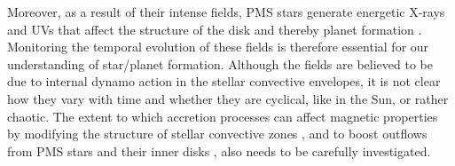 \documentclass[
    traditabstract,
    longauth,
    onecolumn,
]{aa}
\begin{document}
Moreover, as a result of their intense fields, PMS stars generate energetic X-rays and UVs that affect the structure of the disk and thereby planet formation \citep{Skinner_XMMNewton_2017,Brunn_Ionization_2023}.  Monitoring the temporal evolution of these fields is therefore essential for our understanding of star/planet formation.  Although the fields are believed to be due to internal dynamo action in the stellar convective envelopes, it is not clear how they vary with time and whether they are cyclical, like in the Sun, 
or rather chaotic. The extent to which accretion processes can affect magnetic properties by modifying the structure of stellar convective zones \citep{Geroux2016}, and to boost outflows from PMS stars and their inner disks \citep{Matt2012}, also needs to be carefully investigated.  


~
\end{document}
